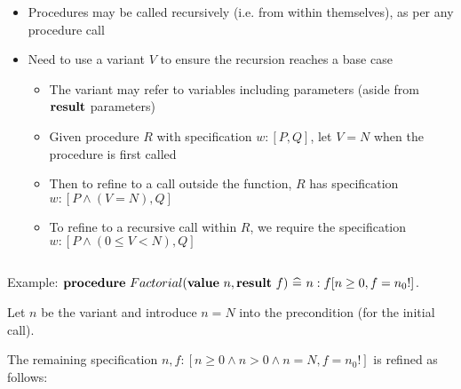 \begin{itemize}
	
	\item Procedures may be called recursively (i.e. from within themselves), as per any procedure call
	
	\item Need to use a variant $ V $ to ensure the recursion reaches a base case
	
	\begin{itemize}
		
		\item The variant may refer to variables including parameters (aside from $ {\bf result} $ parameters)
		
		\item Given procedure $ R $ with specification $ w : [P, Q] $, let $ V = N $ when the procedure is first called
		
		\item Then to refine to a call outside the function, $ R $ has specification $ w : [P \land (V = N), Q] $
		
		\item To refine to a recursive call within $ R $, we require the specification $ w : [P \land (0 \le V < N), Q] $
		
	\end{itemize}
	
\end{itemize}

$ ~ $

Example: $ {\bf procedure} ~ Factorial({\bf value} ~ n, {\bf result} ~ f) ~ \widehat{=} ~ n : f [n \ge 0, f = n_0!] $.

Let $ n $ be the variant and introduce $ n = N $ into the precondition (for the initial call).\\

The remaining specification $ n, f : [n \ge 0 \land n > 0 \land n = N, f = n_0!] $ is refined as follows:

